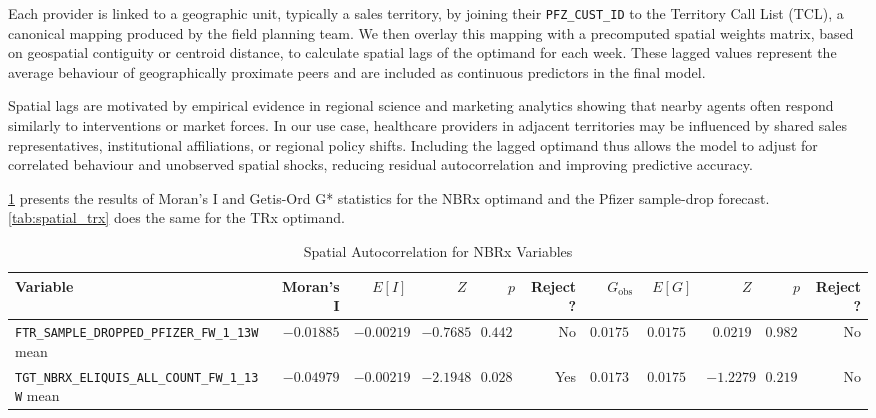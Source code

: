 Each provider is linked to a geographic unit, typically a sales territory, by joining their \texttt{PFZ\_CUST\_ID} to the Territory Call List (TCL), a canonical mapping produced by the field planning team. We then overlay this mapping with a precomputed spatial weights matrix, based on geospatial contiguity or centroid distance, to calculate spatial lags of the optimand for each week. These lagged values represent the average behaviour of geographically proximate peers and are included as continuous predictors in the final model.

Spatial lags are motivated by empirical evidence in regional science and marketing analytics showing that nearby agents often respond similarly to interventions or market forces. In our use case, healthcare providers in adjacent territories may be influenced by shared sales representatives, institutional affiliations, or regional policy shifts. Including the lagged optimand thus allows the model to adjust for correlated behaviour and unobserved spatial shocks, reducing residual autocorrelation and improving predictive accuracy.

\cref{tab:spatial_nbrx} presents the results of Moran's I and Getis-Ord G* statistics for the NBRx optimand and the Pfizer sample-drop forecast. \cref{tab:spatial_trx} does the same for the TRx optimand.

\begin{table}[ht]
  \centering
  \small
  \begin{tabular}{@{}lrrrrrrrrrr@{}}
    \toprule
    \textbf{Variable} & \textbf{Moran's I} & $E[I]$ & $Z$ & $p$ & \textbf{Reject?} & $G_{\mathrm{obs}}$ & $E[G]$ & $Z$ & $p$ & \textbf{Reject?} \\
    \midrule
    \texttt{FTR\_SAMPLE\_DROPPED\_PFIZER\_FW\_1\_13W} mean
      & $-0.01885$ & $-0.00219$ & $-0.7685$ & $0.4422$ & No
      & $0.01751$ & $0.01751$ & $0.0219$ & $0.9825$ & No \\
    \texttt{TGT\_NBRX\_ELIQUIS\_ALL\_COUNT\_FW\_1\_13W} mean
      & $-0.04979$ & $-0.00219$ & $-2.1948$ & $0.0282$ & Yes
      & $0.01739$ & $0.01751$ & $-1.2279$ & $0.2195$ & No \\
    \bottomrule
  \end{tabular}
  \caption{Spatial Autocorrelation for NBRx Variables}
  \label{tab:spatial_nbrx}
\end{table}

